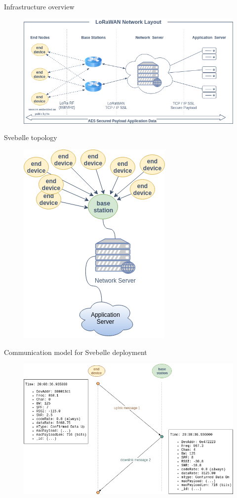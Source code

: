 \documentclass{beamer}
\begin{document}
  \begin{frame}{Infrastructure overview}
    \begin{figure}
      \includegraphics[width=\linewidth]{images/LoRaWAN-Network-Layout.png}
    \end{figure}
  \end{frame}

  \begin{frame}{Svebølle topology}
    \begin{figure}
      \includegraphics[width=0.48\linewidth]{images/Svebolle-Topology.png}
    \end{figure}
  \end{frame}

  \begin{frame}{Communication model for Svebølle deployment}
    \begin{figure}
      \includegraphics[width=\linewidth]{images/Svebolle-ed-bs-model.png}
    \end{figure}
  \end{frame}
\end{document}
